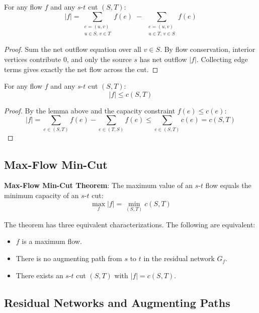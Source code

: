 \begin{lemma}
	For any flow $f$ and any $s$-$t$ cut $(S, T)$:
	$$|f| = \sum_{\substack{e = (u,v) \\ u \in S,\, v \in T}} f(e) \;-\; \sum_{\substack{e = (u,v) \\ u \in T,\, v \in S}} f(e)$$
\end{lemma}

\begin{proof}
	Sum the net outflow equation over all $v \in S$. By flow conservation, interior vertices contribute $0$, and only the source $s$ has net outflow $|f|$. Collecting edge terms gives exactly the net flow across the cut.
\end{proof}

\begin{theorem}
	For any flow $f$ and any $s$-$t$ cut $(S, T)$:
	$$|f| \leq c(S, T)$$
\end{theorem}

\begin{proof}
	By the lemma above and the capacity constraint $f(e) \leq c(e)$:
	$$|f| = \sum_{e \in (S,T)} f(e) - \sum_{e \in (T,S)} f(e) \leq \sum_{e \in (S,T)} c(e) = c(S, T)$$
\end{proof}

\subsection{Max-Flow Min-Cut}

\begin{theorem}
	\textbf{Max-Flow Min-Cut Theorem}: The maximum value of an $s$-$t$ flow equals the minimum capacity of an $s$-$t$ cut:
	$$\max_f |f| = \min_{(S,T)} c(S, T)$$
\end{theorem}

\begin{remark}
	The theorem has three equivalent characterizations. The following are equivalent:
	\begin{itemize}
		\item $f$ is a maximum flow.
		\item There is no augmenting path from $s$ to $t$ in the residual network $G_f$.
		\item There exists an $s$-$t$ cut $(S, T)$ with $|f| = c(S, T)$.
	\end{itemize}
\end{remark}

\subsection{Residual Networks and Augmenting Paths}

